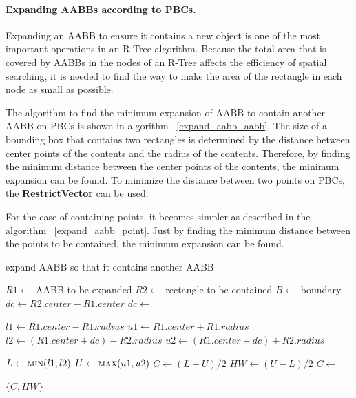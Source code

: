 \documentclass[10pt,letterpaper,twocolumn]{article}
\begin{document}
\paragraph{Expanding AABBs according to PBCs.}
Expanding an AABB to ensure it contains a new object is one of the most
important operations in an R-Tree algorithm.
Because the total area that is covered by AABBs in the nodes of an R-Tree
affects the efficiency of spatial searching, it is needed to find the way to
make the area of the rectangle in each node as small as possible.

The algorithm to find the minimum expansion of AABB to contain another AABB on
PBCs is shown in algorithm ~\ref{expand_aabb_aabb}.
The size of a bounding box that contains two rectangles is determined by the
distance between center points of the contents and the radius of the contents.
Therefore, by finding the minimum distance between the center points of the contents, the minimum expansion can be found. To minimize the distance between two points on PBCs,
the \textbf{RestrictVector} can be used.

For the case of containing points, it becomes simpler as described in the algorithm
~\ref{expand_aabb_point}.
Just by finding the minimum distance between the points to be contained, the minimum expansion can be found.

\begin{algorithm}[thb]
    \caption{expand AABB so that it contains another AABB}
    \label{expand_aabb_aabb}
    \begin{algorithmic}
        \State $R1 \gets$ AABB to be expanded
        \State $R2 \gets$ rectangle to be contained
        \State $B  \gets$ boundary
            \State $dc \gets R2.center - R1.center$
            \State $dc \gets$ 

            \State $l1 \gets R1.center - R1.radius$
            \State $u1 \gets R1.center + R1.radius$
            \State $l2 \gets (R1.center + dc) - R2.radius$
            \State $u2 \gets (R1.center + dc) + R2.radius$

            \State $L  \gets \Call{min}{l1, l2}$
            \State $U  \gets \Call{max}{u1, u2}$
            \State $C  \gets (L + U) / 2$
            \State $HW \gets (U - L) / 2$
            \State $C  \gets$ 

            \State \Return $\{C, HW\}$
        \EndFunction
     \end{algorithmic}
\end{algorithm}
\end{document}
